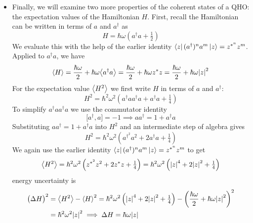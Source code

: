 \documentclass[11pt, a4paper]{article}
\newcommand{\evb}[1]{\big \langle {#1} \big \rangle}  %
\begin{document}
\begin{itemize}
	\item Finally, we will examine two more properties of the coherent states of a QHO: the expectation values of the Hamiltonian $ H $. First, recall the Hamiltonian can be written in terms of $ a $ and $ a^{\dagger} $ as
	\begin{equation*}
		H = \hbar \omega\left(a^{\dagger}a + \tfrac{1}{2}\right)
	\end{equation*}
	We evaluate this with the help of the earlier identity $ 		\bra{z}(a^{\dagger})^{n}a^{m}\ket{z} = z^{*^{n}}z^{m} $. Applied to $ a^{\dagger}a $, we have
	\begin{equation*}
		\ev{H} = \frac{\hbar \omega}{2} + \hbar \omega \evb{a^{\dagger}a} = \frac{\hbar \omega}{2} + \hbar \omega z^{*}z = \frac{\hbar \omega}{2} + \hbar \omega \abs{z}^{2}
	\end{equation*}
	For the expectation value $ \ev{H^{2}} $ we first write $ H $ in terms of $ a  $ and $ a^{\dagger} $: 
	\begin{equation*}
		H^{2} = \hbar^{2} \omega^{2}\left(a^{\dagger}aa^{\dagger}a + a^{\dagger}a + \tfrac{1}{4}\right)
	\end{equation*}
	To simplify $ a^{\dagger}aa^{\dagger}a $ we use the commutator identity
	\begin{equation*}
		\big[a^{\dagger}, a\big] = -1 \implies aa^{\dagger} = 1 + a^{\dagger}a
	\end{equation*}
	Substituting $ aa^{\dagger} = 1 + a^{\dagger}a $  into $ H^{2} $ and an intermediate step of algebra gives
	\begin{equation*}
		H^{2} = \hbar^{2} \omega^{2}\left(a^{\dagger^{2}}a^{2} + 2a^{\dagger}a + \tfrac{1}{4}\right)
	\end{equation*}
	We again use the earlier identity $ 		\bra{z}(a^{\dagger})^{n}a^{m}\ket{z} = z^{*^{n}}z^{m} $ to get
	\begin{equation*}
		\ev{H^{2}} = \hbar^{2} \omega^{2} \left(z^{*^{2}}z^{2} + 2z^{*}z + \tfrac{1}{4}\right) = \hbar^{2} \omega^{2} \left(\abs{z}^{4} + 2\abs{z}^{2} + \tfrac{1}{4}\right)
	\end{equation*}
	 energy uncertainty is
	\begin{align*}
		\big(\Delta H\big)^{2} &= \ev{H^{2}} - \ev{H}^{2} = \hbar^{2} \omega^{2} \left(\abs{z}^{4} + 2\abs{z}^{2} + \tfrac{1}{4}\right) - \left(\frac{\hbar \omega}{2} + \hbar \omega \abs{z}^{2}\right)^{2}\\
		&= \hbar^{2}\omega^{2}\abs{z}^{2} \implies \Delta H = \hbar \omega \abs{z}
	\end{align*}
	

\end{itemize}
\end{document}
